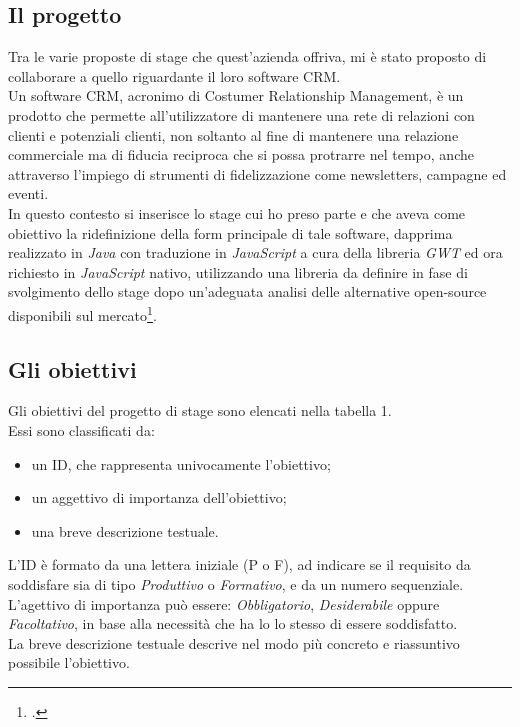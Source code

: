 \subsection{Il progetto}
Tra le varie proposte di stage che quest'azienda offriva, mi è stato proposto di collaborare a quello riguardante il loro software CRM.\\
Un software CRM, acronimo di Costumer Relationship Management, è un prodotto che permette all'utilizzatore di mantenere una rete di relazioni con clienti e potenziali clienti, non soltanto al fine di mantenere una relazione commerciale ma di fiducia reciproca che si possa protrarre nel tempo, anche attraverso l'impiego di strumenti di fidelizzazione come newsletters, campagne ed eventi. \\
In questo contesto si inserisce  lo stage cui ho preso parte e che aveva come obiettivo la ridefinizione della form principale di tale software, dapprima realizzato in \emph{Java} con traduzione in \emph{JavaScript} a cura della libreria \emph{GWT} ed ora richiesto in \emph{JavaScript} nativo, utilizzando una libreria da definire in fase di svolgimento dello stage dopo un'adeguata analisi delle alternative open-source disponibili sul mercato\footcite{queste ed altre tecnologie verranno discusse nel dettaglio nei capitoli seguenti}. 

\subsection{Gli obiettivi}
Gli obiettivi del progetto di stage sono elencati nella tabella 1.\\ %
Essi sono classificati da:

\begin{itemize}
\item un ID, che rappresenta univocamente l'obiettivo;
\item un aggettivo di importanza dell'obiettivo;
\item una breve descrizione testuale.
\end{itemize}

L'ID è formato da una lettera iniziale (P o F), ad indicare se il requisito da soddisfare sia di tipo \emph{Produttivo} o \emph{Formativo}, e da un numero sequenziale.\\
L'agettivo di importanza può essere: \emph{Obbligatorio}, \emph{Desiderabile} oppure \emph{Facoltativo}, in base alla necessità che ha lo lo stesso di essere soddisfatto.\\
La breve descrizione testuale descrive nel modo più concreto e riassuntivo possibile l'obiettivo.\\

